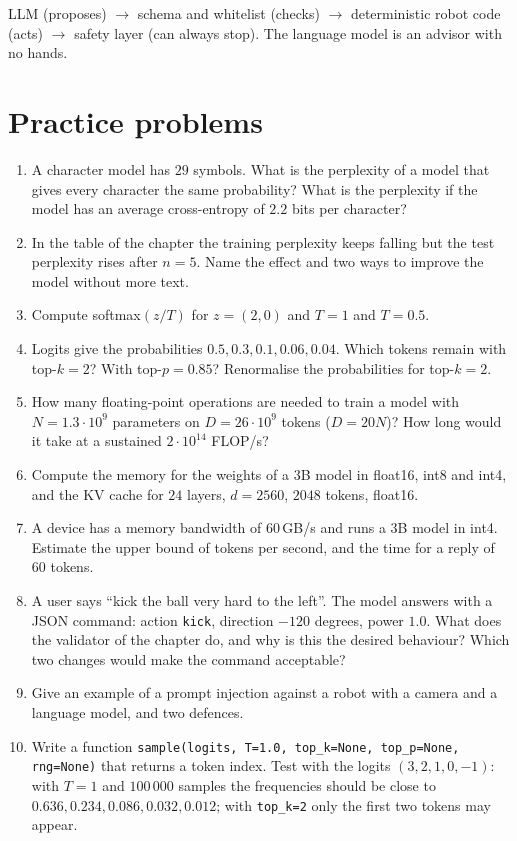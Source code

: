 \begin{aibox}
LLM (proposes) $\rightarrow$ schema and whitelist (checks) $\rightarrow$ deterministic robot code (acts) $\rightarrow$ safety layer (can always stop). The language model is an advisor with no hands.
\end{aibox}

\section*{Practice problems}
\begin{enumerate}[label=\textbf{\thechapter.\arabic*}]
  \item A character model has $29$ symbols. What is the perplexity of a model that gives every character the same probability? What is the perplexity if the model has an average cross-entropy of $2.2$ bits per character?
  \item In the table of the chapter the training perplexity keeps falling but the test perplexity rises after $n=5$. Name the effect and two ways to improve the model without more text.
  \item Compute softmax$(z/T)$ for $z=(2,0)$ and $T=1$ and $T=0.5$.
  \item Logits give the probabilities $0.5,0.3,0.1,0.06,0.04$. Which tokens remain with top-$k=2$? With top-$p=0.85$? Renormalise the probabilities for top-$k=2$.
  \item How many floating-point operations are needed to train a model with $N=1.3\cdot10^9$ parameters on $D=26\cdot10^9$ tokens ($D=20N$)? How long would it take at a sustained $2\cdot10^{14}$ FLOP/s?
  \item Compute the memory for the weights of a $3$B model in float16, int8 and int4, and the KV cache for $24$ layers, $d=2560$, $2048$ tokens, float16.
  \item A device has a memory bandwidth of $60$\,GB/s and runs a $3$B model in int4. Estimate the upper bound of tokens per second, and the time for a reply of $60$ tokens.
  \item A user says ``kick the ball very hard to the left''. The model answers with a JSON command: action \verb!kick!, direction $-120$ degrees, power $1.0$. What does the validator of the chapter do, and why is this the desired behaviour? Which two changes would make the command acceptable?
  \item Give an example of a prompt injection against a robot with a camera and a language model, and two defences.
  \item[\textbf{\thechapter.10}$\star$] Write a function \texttt{sample(logits, T=1.0, top\_k=None, top\_p=None, rng=None)} that returns a token index. Test with the logits $(3,2,1,0,-1)$: with $T=1$ and $100\,000$ samples the frequencies should be close to $0.636,0.234,0.086,0.032,0.012$; with \texttt{top\_k=2} only the first two tokens may appear.
\end{enumerate}
